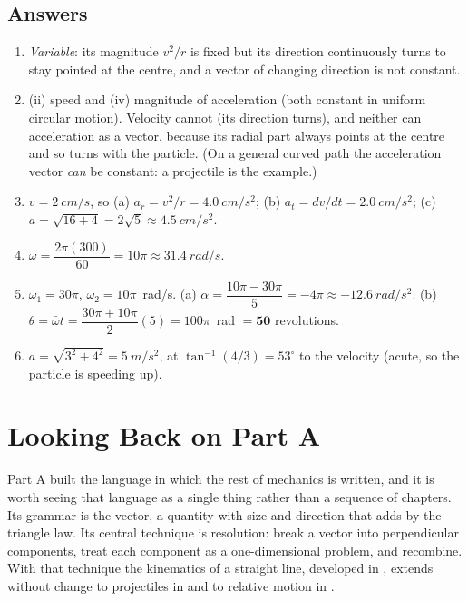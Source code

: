 \subsection*{Answers}
{\small
\begin{enumerate}[itemsep=2pt]
\item \emph{Variable}: its magnitude $v^2/r$ is fixed but its direction continuously turns to
stay pointed at the centre, and a vector of changing direction is not constant.
\item (ii) speed and (iv) magnitude of acceleration (both constant in uniform circular motion).
Velocity cannot (its direction turns), and neither can acceleration as a vector, because its radial
part always points at the centre and so turns with the particle. (On a general curved path the
acceleration vector \emph{can} be constant: a projectile is the example.)
\item $v=\SI{2}{cm/s}$, so (a) $a_r=v^2/r=\SI{4.0}{cm/s^2}$; (b) $a_t=dv/dt=\SI{2.0}{cm/s^2}$;
(c) $a=\sqrt{16+4}=2\sqrt5\approx\SI{4.5}{cm/s^2}$.
\item $\omega=\dfrac{2\pi(300)}{60}=10\pi\approx\SI{31.4}{rad/s}$.
\item $\omega_1=30\pi$, $\omega_2=10\pi$~\si{rad/s}. (a) $\alpha=\dfrac{10\pi-30\pi}{5}=-4\pi
\approx\SI{-12.6}{rad/s^2}$. (b) $\theta=\bar\omega t=\dfrac{30\pi+10\pi}{2}(5)=100\pi$~\si{rad}
$=\mathbf{50}$ revolutions.
\item $a=\sqrt{3^2+4^2}=\SI{5}{m/s^2}$, at $\tan^{-1}(4/3)=53^\circ$ to the velocity (acute, so
the particle is speeding up).
\end{enumerate}
}


\section*{Looking Back on Part A}

Part A built the language in which the rest of mechanics is written, and it is worth seeing that
language as a single thing rather than a sequence of chapters. Its grammar is the vector, a quantity with
size and direction that adds by the triangle law. Its central technique is resolution: break a vector
into perpendicular components, treat each component as a one-dimensional problem, and recombine. With
that technique the kinematics of a straight line, developed in , extends without
change to projectiles in  and to relative motion in .

